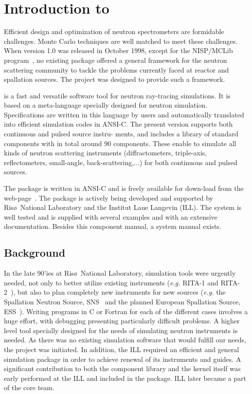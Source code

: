  
\chapter{Introduction to \MCS}

Efficient design and optimization of neutron spectrometers are
formidable challenges. Monte Carlo techniques are well matched to meet
these challenges. When \MCS version 1.0 was released in October
1998, except for the NISP/MCLib program~\cite{nisp_webpage}, no existing package offered a general framework for the neutron
scattering community to tackle the problems currently faced at reactor and
spallation sources. The \MCS project was designed to provide such a framework.

\MCS %
is a fast and versatile software tool for neutron ray-tracing simulations.
It is based on a meta-language specially designed for neutron
simulation. Specifications are written in this language by users and
automatically translated into efficient simulation codes in ANSI-C.
The present version supports both continuous and pulsed source instru-
ments, and includes a library of standard
components with in total around 90 components. These enable to simulate all kinds of neutron scattering instruments (diffractometers, triple-axis, reflectometers, small-angle, back-scattering,...) for both continuous and pulsed sources.

The \MCS package is written in ANSI-C and is freely available for down-load
from the \MCS web-page~\cite{mcstas_webpage}. The package is actively
being developed and supported by Ris\o\ National Laboratory 
and the Institut Laue Langevin (ILL). 
The system is well tested and
is supplied with several examples and with an extensive documentation.
Besides this component manual, a system manual exists.


\section{Background}

In the late 90'ies at Ris\o\ National Laboratory, 
simulation tools were urgently needed,
not only to better utilize existing instruments
({\em e.g.} RITA-1 and RITA-2~\cite{cjp_73_697,pb_241_50,pb_283_343}), 
but also to plan completely new instruments for new sources 
({\em e.g.} the Spallation Neutron Source, SNS~\cite{sns_webpage} 
and the planned European Spallation Source, ESS~\cite{ess_webpage}). 
Writing programs in C or Fortran for
each of the different cases involves a huge effort, with debugging presenting
particularly difficult problems. A higher level tool specially designed
for the needs of simulating neutron instruments is needed. As there was
no existing simulation software that would fulfill our needs, the \MCS 
project was initiated.
In addition, the ILL required an efficient and general simulation
package in order to achieve renewal of its instruments and guides. 
A significant contribution to both the component library and the \MCS 
kernel itself was early performed at the ILL and included in the package.
ILL later became a part of the core \MCS team.

